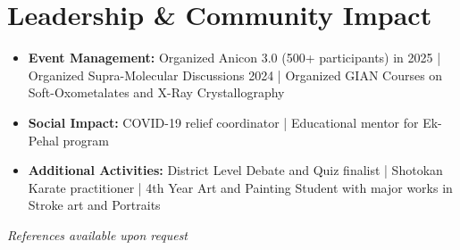 \documentclass[a4paper,10.8pt]{article}
\newcommand{\compactSection}[2]{
    \section{#1}
    \vspace{-0.1cm}
    #2
    \vspace{-0.2cm}
}
\begin{document}
\compactSection{Leadership \& Community Impact}{
\begin{itemize}[leftmargin=*,label={},itemsep=2pt]
    \item \textbf{Event Management:} \small {Organized Anicon 3.0 (500+ participants) in 2025 | Organized Supra-Molecular Discussions 2024 | Organized GIAN Courses on Soft-Oxometalates and X-Ray Crystallography}
    \item \textbf{Social Impact:} \small{ COVID-19 relief coordinator | Educational mentor for Ek-Pehal program}
    \item \textbf{Additional Activities:} \small {District Level Debate and Quiz finalist | Shotokan Karate practitioner | 4th Year Art and Painting Student with major works in Stroke art and Portraits}
\end{itemize}}
\vspace{-0.4cm}
\vspace*{\fill}
\begin{flushright}
\textit{References available upon request}
\end{flushright}
\end{document}
